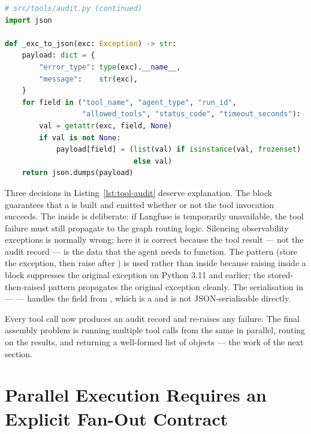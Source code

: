 \begin{lstlisting}[language=Python,
  caption={\_exc\_to\_json helper used by invoke\_and\_record},
  label={lst:tool-audit-helper}]
# src/tools/audit.py (continued)
import json

def _exc_to_json(exc: Exception) -> str:
    payload: dict = {
        "error_type": type(exc).__name__,
        "message":    str(exc),
    }
    for field in ("tool_name", "agent_type", "run_id",
                  "allowed_tools", "status_code", "timeout_seconds"):
        val = getattr(exc, field, None)
        if val is not None:
            payload[field] = (list(val) if isinstance(val, frozenset)
                              else val)
    return json.dumps(payload)
\end{lstlisting}

Three decisions in Listing~\ref{lst:tool-audit} deserve explanation. The
 block guarantees that a  is built
and emitted whether or not the tool invocation succeeds. The  inside  is deliberate: if Langfuse is
temporarily unavailable, the tool failure must still propagate to the graph
routing logic. Silencing observability exceptions is normally wrong; here
it is correct because the tool result --- not the audit record --- is
the data that the agent needs to function. The  pattern
(store the exception, then raise after ) is used rather
than  inside  because raising inside a
 block suppresses the original exception on Python 3.11 and
earlier; the stored-then-raised pattern propagates the original exception
cleanly. The  serialisation in  ---
 --- handles the
 field from , which is a
 and is not JSON-serialisable directly.

Every tool call now produces an audit record and re-raises any failure.
The final assembly problem is running multiple tool calls from the same
 in parallel, routing on the results, and returning a
well-formed list of  objects --- the work of the next
section.


\section{Parallel Execution Requires an Explicit Fan-Out Contract}
\label{sec:tool-node}

